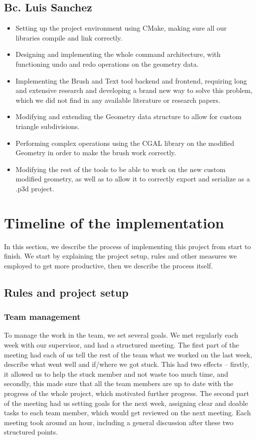 \subsection{Bc. Luis Sanchez}
\begin{itemize}
\item Setting up the project environment using CMake, making sure all our libraries compile and link correctly.
\item Designing and implementing the whole command architecture, with functioning undo and redo operations on the geometry data.
\item Implementing the Brush and Text tool backend and frontend, requiring long and extensive research and developing a brand new way to solve this problem, which we did not find in any available literature or research papers.
\item Modifying and extending the Geometry data structure to allow for custom triangle subdivisions.
\item Performing complex operations using the CGAL library on the modified Geometry in order to make the brush work correctly.
\item Modifying the rest of the tools to be able to work on the new custom modified geometry, as well as to allow it to correctly export and serialize as a .p3d project.
\end{itemize}

\section{Timeline of the implementation}

In this section, we describe the process of implementing this project from start to finish. We start by explaining the project setup, rules and other measures we employed to get more productive, then we describe the process itself.

\subsection{Rules and project setup}

\subsubsection{Team management}
To manage the work in the team, we set several goals. We met regularly each week with our supervisor, and had a structured meeting. The first part of the meeting had each of us tell the rest of the team what we worked on the last week, describe what went well and if/where we got stuck. This had two effects -- firstly, it allowed us to help the stuck member and not waste too much time, and secondly, this made sure that all the team members are up to date with the progress of the whole project, which motivated further progress. The second part of the meeting had us setting goals for the next week, assigning clear and doable tasks to each team member, which would get reviewed on the next meeting. Each meeting took around an hour, including a general discussion after these two structured points.

